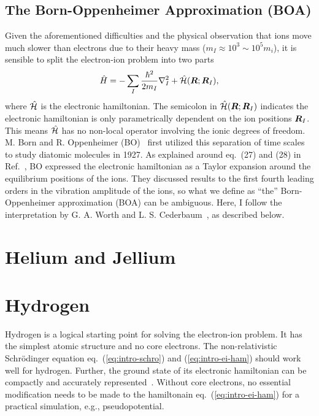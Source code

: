 \subsection{The Born-Oppenheimer Approximation (BOA)}
Given the aforementioned difficulties and the physical observation that ions move much slower than electrons due to their heavy mass ($m_I\approx 10^3\sim 10^5 m_i$), it is sensible to split the electron-ion problem into two parts
\begin{align} \label{eq:intro-ei-to-e-ham}
\hat{H} = -\sum_I \frac{\hbar^2}{2m_I} \nabla^2_I
+ \hat{\mathcal{H}}(\boldsymbol{R};\boldsymbol{R}_I),
\end{align}
where $\hat{\mathcal{H}}$ is the electronic hamiltonian. The semicolon in $\hat{\mathcal{H}}(\boldsymbol{R};\boldsymbol{R}_I)$ indicates the electronic hamiltonian is only parametrically dependent on the ion positions $\boldsymbol{R}_I$. This means $\hat{\mathcal{H}}$ has no non-local operator involving the ionic degrees of freedom. M. Born and R. Oppenheimer (BO)~\cite{Born1927} first utilized this separation of time scales to study diatomic molecules in 1927. As explained around eq.~(27) and (28) in Ref.~\cite{Born1927}, BO expressed the electronic hamiltonian as a Taylor expansion around the equilibrium positions of the ions. They discussed results to the first fourth leading orders in the vibration amplitude of the ions, so what we define as ``the'' Born-Oppenheimer approximation (BOA) can be ambiguous. Here, I follow the interpretation by G. A. Worth and L. S. Cederbaum~\cite{Worth2004}, as described below.



\section{Helium and Jellium}

\section{Hydrogen}
Hydrogen is a logical starting point for solving the electron-ion problem.
It has the simplest atomic structure and no core electrons.
The non-relativistic Schr\"odinger equation eq.~(\ref{eq:intro-schro}) and (\ref{eq:intro-ei-ham}) should work well for hydrogen. Further, the ground state of its electronic hamiltonian can be compactly and accurately represented~\cite{Holzmann2003}.
Without core electrons, no essential modification needs to be made to the hamiltonain eq.~(\ref{eq:intro-ei-ham}) for a practical simulation, e.g., pseudopotential.

